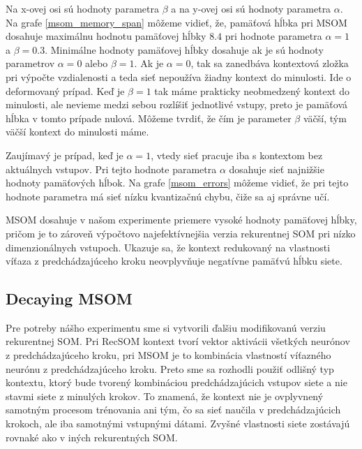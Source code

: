 Na x-ovej osi sú hodnoty parametra $\beta$ a na y-ovej osi sú hodnoty parametra $\alpha$. 
 Na grafe \ref{msom_memory_span} môžeme vidieť, že, pamäťová hĺbka pri MSOM dosahuje maximálnu 
 hodnotu pamäťovej hĺbky $8.4$ pri hodnote parametra $\alpha = 1$ a $\beta = 0.3$.  
 Minimálne hodnoty pamäťovej hĺbky dosahuje ak je sú hodnoty parametrov $\alpha = 0$ alebo $\beta = 1$.
 Ak je $\alpha = 0$, tak sa zanedbáva kontextová zložka pri výpočte vzdialenosti a teda sieť nepoužíva žiadny kontext do minulosti. Ide o deformovaný prípad.
 Keď je $\beta = 1$ tak máme prakticky neobmedzený kontext do minulosti, ale nevieme medzi sebou rozlíšiť jednotlivé vstupy, preto je 
 pamäťová hĺbka v tomto prípade nulová. Môžeme tvrdiť, že čím je parameter $\beta$ väčší, tým väčší kontext do minulosti máme.
 
 Zaujímavý je prípad, keď je $\alpha = 1$, vtedy sieť pracuje iba s kontextom bez aktuálnych vstupov. 
 Pri tejto hodnote parametra $\alpha$
 dosahuje sieť najnižšie hodnoty pamäťových hĺbok.
 Na grafe \ref{msom_errors} môžeme vidieť, že pri tejto hodnote parametra má sieť nízku kvantizačnú chybu, čiže sa aj správne učí.

 MSOM dosahuje v našom experimente priemere vysoké hodnoty pamäťovej hĺbky, pričom je to zároveň 
 výpočtovo najefektívnejšia verzia rekurentnej SOM pri nízko dimenzionálnych vstupoch. 
 Ukazuje sa, že kontext redukovaný na vlastnosti víťaza z predchádzajúceho kroku neovplyvňuje negatívne pamäťvú hĺbku siete.



\subsection{Decaying MSOM}
Pre potreby nášho experimentu sme si vytvorili ďalšiu modifikovanú verziu %
rekurentnej SOM. Pri RecSOM kontext tvorí vektor aktivácii všetkých neurónov z predchádzajúceho kroku, 
pri MSOM je to kombinácia vlastností víťazného neurónu z predchádzajúceho kroku. 
Preto sme sa rozhodli použiť odlišný typ kontextu, ktorý bude tvorený kombináciou predchádzajúcich vstupov 
siete a nie stavmi siete z minulých krokov. To znamená, že kontext nie je ovplyvnený samotným procesom trénovania
ani tým, čo sa sieť naučila v predchádzajúcich krokoch, ale iba samotnými vstupnými dátami.
Zvyšné vlastnosti siete zostávajú rovnaké ako v iných rekurentných SOM.

